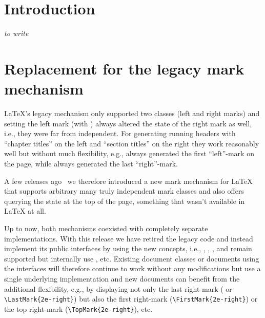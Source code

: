 \documentclass{ltnews}
\begin{document}
\maketitle
{  \spaceskip=3.33pt 
\tableofcontents}

\setlength{}

\medskip

\section{Introduction}

\emph{to write}

\section{Replacement for the legacy mark mechanism}



\LaTeX{}'s legacy mechanism only supported two classes (left and right
marks) and setting the left mark (with ) always altered
the state of the right mark as well, i.e., they were far from
independent. For generating running headers with \enquote{chapter
  titles} on the left and \enquote{section titles} on the right they
work reasonably well but without much flexibility, e.g., 
always generated the first \enquote{left}-mark on the page, while
 always generated the last \enquote{right}-mark.

A few releases ago~\cite{41:ltnews35} we therefore introduced a new
mark mechanism for \LaTeX{} that supports arbitrary many truly
independent mark classes and also offers querying the state at the top
of the page, something that wasn't available in \LaTeX{} at all.

Up to now, both mechanisms coexisted with completely separate
implementations. With this release we have retired the legacy code and
instead implement its public interfaces by using the new concepts,
i.e., , , , and 
remain supported but internally use , etc.  Existing
document classes or documents using the interfaces will therefore
continue to work without any modifications but use a single underlying
implementation and new documents can benefit from the additional
flexibility, e.g., by displaying not only the last right-mark
( or \verb=\LastMark{2e-right}=) but also the first
right-mark (\verb=\FirstMark{2e-right}=) or the top right-mark
(\verb=\TopMark{2e-right}=), etc.
\end{document}
